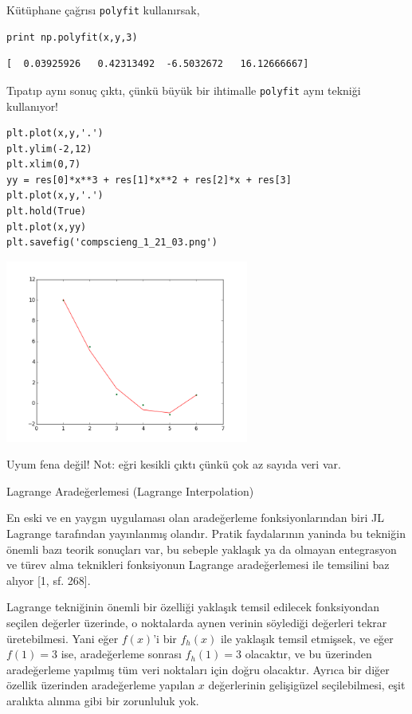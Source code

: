 \documentclass[12pt,fleqn]{article}\usepackage{../../common}
\begin{document}
Kütüphane çağrısı \verb!polyfit! kullanırsak,

\begin{verbatim}
print np.polyfit(x,y,3)
\end{verbatim}

\begin{verbatim}
[  0.03925926   0.42313492  -6.5032672   16.12666667]
\end{verbatim}

Tıpatıp aynı sonuç çıktı, çünkü büyük bir ihtimalle \verb!polyfit! aynı
tekniği kullanıyor! 

\begin{verbatim}
plt.plot(x,y,'.')
plt.ylim(-2,12)
plt.xlim(0,7)
yy = res[0]*x**3 + res[1]*x**2 + res[2]*x + res[3]
plt.plot(x,y,'.')
plt.hold(True)
plt.plot(x,yy)
plt.savefig('compscieng_1_21_03.png')
\end{verbatim}

\includegraphics[height=6cm]{compscieng_1_21_03.png}

Uyum fena değil! Not: eğri kesikli çıktı çünkü çok az sayıda veri var. 

Lagrange Aradeğerlemesi (Lagrange Interpolation)

En eski ve en yaygın uygulaması olan aradeğerleme fonksiyonlarından biri JL
Lagrange tarafından yayınlanmış olandır. Pratik faydalarının yaninda bu tekniğin
önemli bazı teorik sonuçları var, bu sebeple yaklaşık ya da olmayan entegrasyon
ve türev alma teknikleri fonksiyonun Lagrange aradeğerlemesi ile temsilini baz
alıyor [1, sf. 268].

Lagrange tekniğinin önemli bir özelliği yaklaşık temsil edilecek fonksiyondan
seçilen değerler üzerinde, o noktalarda aynen verinin söylediği değerleri tekrar
üretebilmesi. Yani eğer $f(x)$'i bir $f_h(x)$ ile yaklaşık temsil etmişsek, ve
eğer $f(1) = 3$ ise, aradeğerleme sonrası $f_h(1) = 3$ olacaktır, ve bu
üzerinden aradeğerleme yapılmış tüm veri noktaları için doğru olacaktır. Ayrıca
bir diğer özellik üzerinden aradeğerleme yapılan $x$ değerlerinin gelişigüzel
seçilebilmesi, eşit aralıkta alınma gibi bir zorunluluk yok.
\end{document}
